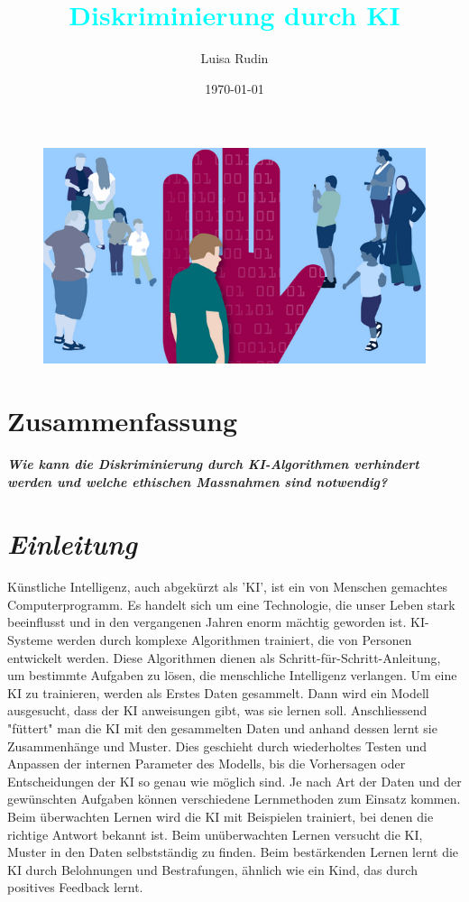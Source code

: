 \documentclass{article}
\title{\textcolor{cyan}{Diskriminierung durch KI}}
\author{Luisa Rudin}
\date{\today}
\begin{document}
\maketitle

\begin{figure}[ht]
    \centering
    \includegraphics[width=1\textwidth]{KI Diskriminierung.jpg}
    \caption{}
    \label{fig:Diskriminierung}
\end{figure}

\section{Zusammenfassung}
    \textbf{\textit{
    Wie kann die Diskriminierung durch KI-Algorithmen verhindert werden und welche ethischen Massnahmen sind notwendig?}}


\tableofcontents

\section{\textit{Einleitung}}
Künstliche Intelligenz, auch abgekürzt als 'KI', ist ein von Menschen gemachtes Computerprogramm. Es handelt sich um eine Technologie, die unser Leben stark beeinflusst und in den vergangenen Jahren enorm mächtig geworden ist. KI-Systeme werden durch komplexe Algorithmen trainiert, die von Personen entwickelt werden. Diese Algorithmen dienen als Schritt-für-Schritt-Anleitung, um bestimmte Aufgaben zu lösen, die menschliche Intelligenz verlangen.  Um eine KI zu trainieren, werden als Erstes Daten gesammelt. Dann wird ein Modell ausgesucht, dass der KI anweisungen gibt, was sie lernen soll. Anschliessend "füttert" man die KI mit den gesammelten Daten und anhand dessen lernt sie Zusammenhänge und Muster. Dies geschieht durch wiederholtes Testen und Anpassen der internen Parameter des Modells, bis die Vorhersagen oder Entscheidungen der KI so genau wie möglich sind. Je nach Art der Daten und der gewünschten Aufgaben können verschiedene Lernmethoden zum Einsatz kommen. Beim überwachten Lernen wird die KI mit Beispielen trainiert, bei denen die richtige Antwort bekannt ist. Beim unüberwachten Lernen versucht die KI, Muster in den Daten selbstständig zu finden. Beim bestärkenden Lernen lernt die KI durch Belohnungen und Bestrafungen, ähnlich wie ein Kind, das durch positives Feedback lernt.
\end{document}
